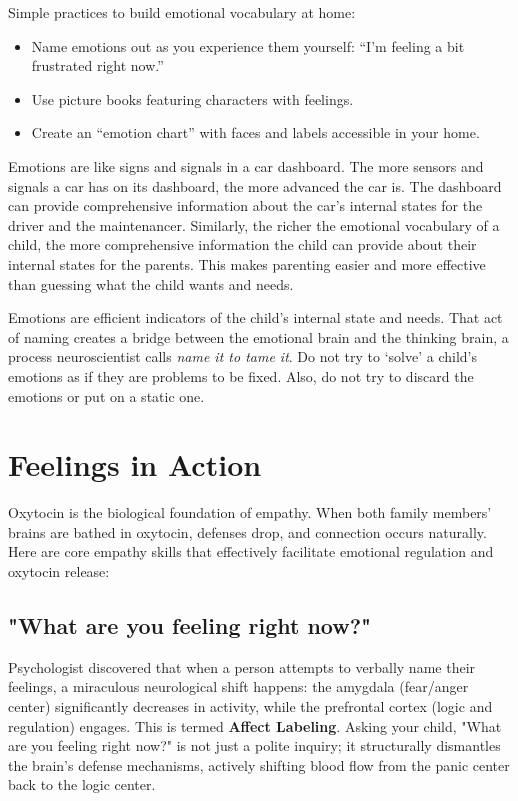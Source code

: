Simple practices to build emotional vocabulary at home:
\begin{itemize}
  \item Name emotions out as you experience them yourself: ``I'm feeling a bit frustrated right now.''
  \item Use picture books featuring characters with feelings.
  \item Create an ``emotion chart'' with faces and labels accessible in your home.
\end{itemize}

Emotions are like signs and signals in a car dashboard.
The more sensors and signals a car has on its dashboard, the more advanced the car is. 
The dashboard can provide comprehensive information about the car's internal states for the driver and the maintenancer.
Similarly, the richer the emotional vocabulary of a child, the more comprehensive information the child can provide about their internal states for the parents.
This makes parenting easier and more effective than guessing what the child wants and needs.

\begin{keyinsight}
Emotions are efficient indicators of the child's internal state and needs.
That act of naming creates a bridge between the emotional brain and the thinking brain, a process neuroscientist calls \textit{name it to tame it}.
Do not try to `solve' a child's emotions as if they are problems to be fixed. 
Also, do not try to discard the emotions or put on a static one.
\end{keyinsight}

\section{Feelings in Action}

Oxytocin is the biological foundation of empathy. When both family members' brains are bathed in oxytocin, defenses drop, and connection occurs naturally. 
Here are core empathy skills that effectively facilitate emotional regulation and oxytocin release:

\subsection{"What are you feeling right now?"}
Psychologist \citet{lieberman2007} discovered that when a person attempts to verbally name their feelings, a miraculous neurological shift happens: the amygdala (fear/anger center) significantly decreases in activity, while the prefrontal cortex (logic and regulation) engages. This is termed \textbf{Affect Labeling}. 
Asking your child, "What are you feeling right now?" is not just a polite inquiry; it structurally dismantles the brain's defense mechanisms, actively shifting blood flow from the panic center back to the logic center.

